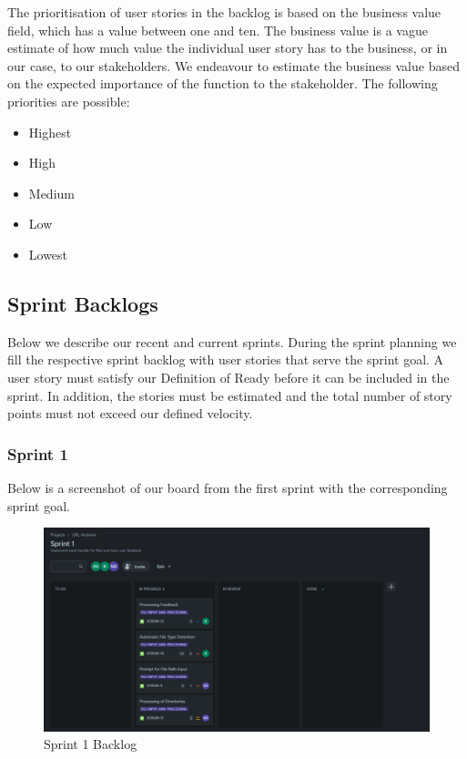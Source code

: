 The prioritisation of user stories in the backlog is based on the business value field, which has a value between one and ten.
The business value is a vague estimate of how much value the individual user story has to the business, or in our case, to our stakeholders.
We endeavour to estimate the business value based on the expected importance of the function to the stakeholder.
The following priorities are possible:
\begin{itemize}
    \item Highest
    \item High
    \item Medium
    \item Low
    \item Lowest
\end{itemize}

\subsection{Sprint Backlogs}
Below we describe our recent and current sprints.
During the sprint planning we fill the respective sprint backlog with user stories that serve the sprint goal.
A user story must satisfy our Definition of Ready before it can be included in the sprint.
In addition, the stories must be estimated and the total number of story points must not exceed our defined velocity.
\clearpage

\subsubsection{Sprint 1}
Below is a screenshot of our board from the first sprint with the corresponding sprint goal.
\begin{figure}[h!]
    \centering
    \includegraphics[width=1\textwidth]{pictures/backlog_sprint_1}
    \caption{Sprint 1 Backlog}
    \label{fig:backlog_sprint_1}
\end{figure}

